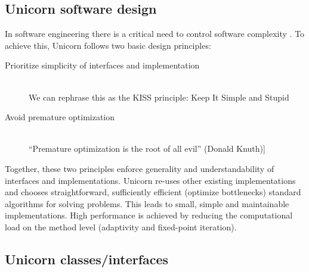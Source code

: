 \subsection{Unicorn software design}

In software engineering there is a critical need to control software
complexity \citep{Brooks1995}. To achieve this, Unicorn follows two
basic design principles:
\begin{description}
\item[Prioritize simplicity of interfaces and implementation]
\ \\
We can rephrase this as the KISS principle: Keep It Simple and Stupid
\item[Avoid premature optimization]
\ \\
``Premature optimization is the root of all evil'' (Donald Knuth)]
\end{description}

Together, these two principles enforce generality and understandability
of interfaces and implementations. Unicorn re-uses other existing
implementations and chooses straightforward, sufficiently efficient
(optimize bottlenecks) standard algorithms for solving problems. This
leads to small, simple and maintainable implementations. High performance
is achieved by reducing the computational load on the method level
(adaptivity and fixed-point iteration).

\subsection{Unicorn classes/interfaces}

